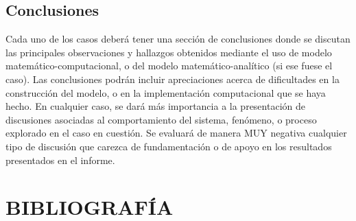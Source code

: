 \documentclass[11pt,stdletter,orderfromtodate,sigleft,twoside]{report}
\begin{document}
\subsection{Conclusiones}
Cada uno de los casos deber\'a tener una secci\'on de conclusiones donde se
discutan las principales observaciones y hallazgos obtenidos mediante el uso de
modelo matem\'atico-computacional, o del modelo matem\'atico-anal\'itico (si
ese fuese el caso).  Las conclusiones podr\'an incluir apreciaciones acerca de
dificultades en la construcci\'on del modelo, o en la implementaci\'on
computacional que se haya hecho. En cualquier caso, se dar\'a m\'as importancia
a la presentaci\'on de discusiones asociadas al comportamiento del sistema,
fen\'omeno, o proceso explorado en el caso en cuesti\'on. Se evaluar\'a de
manera MUY negativa cualquier tipo de discusi\'on que carezca de
fundamentaci\'on o de apoyo en los resultados presentados en el informe.

\lipsum[1-2]

\section{BIBLIOGRAFÍA}
\end{document}
